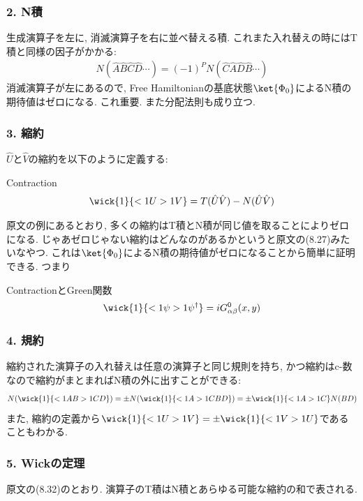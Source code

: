 \documentclass[10.5pt,a4paper]{jreport}
\begin{document}
\subsubsection{2. N積}
生成演算子を左に, 消滅演算子を右に並べ替える積. これまた入れ替えの時にはT積と同様の因子がかかる:
\begin{eqnarray}
  N(\hat{A}\hat{B}\hat{C}\hat{D}\cdots) = (-1)^PN(\hat{C}\hat{A}\hat{D}\hat{B}\cdots)
\end{eqnarray}
消滅演算子が左にあるので, Free Hamiltonianの基底状態$\ket{\Phi_0}$によるN積の期待値はゼロになる. これ重要. また分配法則も成り立つ. 

\subsubsection{3. 縮約}
$\hat{U}$と$\hat{V}$の縮約を以下のように定義する:
\begin{itembox}[c]{Contraction}
  \begin{eqnarray}
    \wick{1}{<1U >1V} = T(\hat{U}\hat{V}) - N(\hat{U}\hat{V})\label{wick3}
  \end{eqnarray}
\end{itembox}
原文の例にあるとおり, 多くの縮約はT積とN積が同じ値を取ることによりゼロになる. じゃあゼロじゃない縮約はどんなのがあるかというと原文の(8.27)みたいなやつ. これは$\ket{\Phi_0}$によるN積の期待値がゼロになることから簡単に証明できる. つまり
\begin{itembox}[c]{ContractionとGreen関数}
  \begin{eqnarray}
    \wick{1}{<1\psi >1\psi^\dagger} = iG^0_{\alpha\beta}(x, y)\label{wick4}
  \end{eqnarray}
\end{itembox}

\subsubsection{4. 規約}
縮約された演算子の入れ替えは任意の演算子と同じ規則を持ち, かつ縮約はc-数なので縮約がまとまればN積の外に出すことができる:
\begin{eqnarray}
  N(\wick{1}{<1A B >1C D}) = \pm N(\wick{1}{<1A >1C B D}) = \pm \wick{1}{<1A >1C}N(BD)
\end{eqnarray}
また, 縮約の定義から$\wick{1}{<1U >1V} = \pm \wick{1}{<1V >1U}$であることもわかる. 

\subsubsection{5. Wickの定理}
原文の(8.32)のとおり. 演算子のT積はN積とあらゆる可能な縮約の和で表される.
\end{document}

